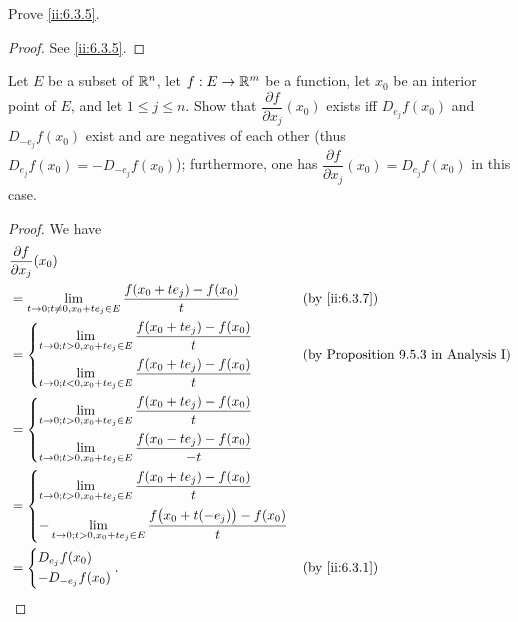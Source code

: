 \exercisesection

\begin{ex}\label{ii:ex:6.3.1}
  Prove \cref{ii:6.3.5}.
\end{ex}

\begin{proof}
  See \cref{ii:6.3.5}.
\end{proof}

\begin{ex}\label{ii:ex:6.3.2}
  Let \(E\) be a subset of \(\mathbb{R}^n\), let \(f : E \to \mathbb{R}^m\) be a function, let \(x_0\) be an interior point of \(E\), and let \(1 \leq j \leq n\).
  Show that \(\dfrac{\partial f}{\partial x_j}(x_0)\) exists iff \(D_{e_j} f(x_0)\) and \(D_{-e_j} f(x_0)\) exist and are negatives of each other
  (thus \(D_{e_j} f(x_0) = -D_{-e_j} f(x_0)\));
  furthermore, one has \(\dfrac{\partial f}{\partial x_j}(x_0) = D_{e_j} f(x_0)\) in this case.
\end{ex}

\begin{proof}
  We have
  \begin{align*}
     & \dfrac{\partial f}{\partial x_j}(x_0)                                                                    \\
     & = \lim_{t \to 0 ; t \neq 0, x_0 + t e_j \in E} \dfrac{f(x_0 + t e_j) - f(x_0)}{t}        &  & \by{ii:6.3.7} \\
     & = \begin{dcases}
           \lim_{t \to 0 ; t > 0, x_0 + t e_j \in E} \dfrac{f(x_0 + t e_j) - f(x_0)}{t} \\
           \lim_{t \to 0 ; t < 0, x_0 + t e_j \in E} \dfrac{f(x_0 + t e_j) - f(x_0)}{t}
         \end{dcases}          &  & \text{(by Proposition 9.5.3 in Analysis I)}                           \\
     & = \begin{dcases}
           \lim_{t \to 0 ; t > 0, x_0 + t e_j \in E} \dfrac{f(x_0 + t e_j) - f(x_0)}{t} \\
           \lim_{t \to 0 ; t > 0, x_0 + t e_j \in E} \dfrac{f(x_0 - t e_j) - f(x_0)}{-t}
         \end{dcases}                           \\
     & = \begin{dcases}
           \lim_{t \to 0 ; t > 0, x_0 + t e_j \in E} \dfrac{f(x_0 + t e_j) - f(x_0)}{t} \\
           -\lim_{t \to 0 ; t > 0, x_0 + t e_j \in E} \dfrac{f\big(x_0 + t (-e_j)\big) - f(x_0)}{t}
         \end{dcases}                \\
     & = \begin{dcases}
           D_{e_j} f(x_0) \\
           - D_{-e_j} f(x_0)
         \end{dcases}.                                                                        &  & \by{ii:6.3.1}
  \end{align*}
\end{proof}

